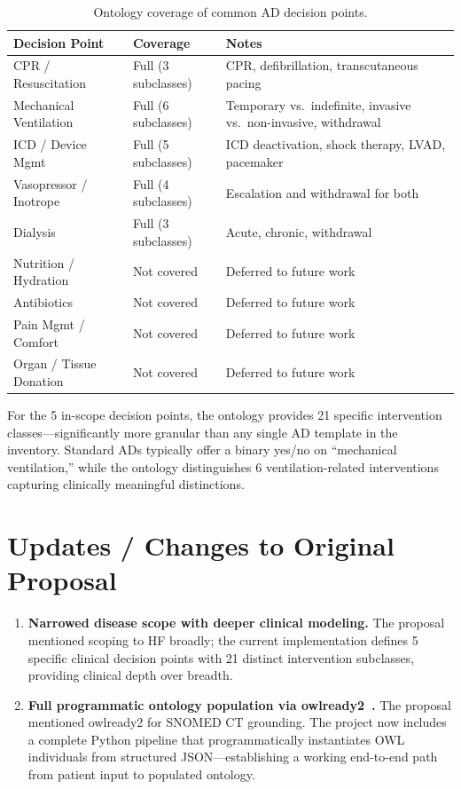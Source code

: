\documentclass[11pt]{article}
\begin{document}
\begin{table}[ht]
\centering
\caption{Ontology coverage of common AD decision points.}
\label{tab:coverage}
\small
\begin{tabular}{L{3.5cm} L{3cm} L{7cm}}
\toprule
\textbf{Decision Point} & \textbf{Coverage} & \textbf{Notes} \\
\midrule
CPR / Resuscitation & Full (3 subclasses) & CPR, defibrillation, transcutaneous pacing \\
Mechanical Ventilation & Full (6 subclasses) & Temporary vs.\ indefinite, invasive vs.\ non-invasive, withdrawal \\
ICD / Device Mgmt & Full (5 subclasses) & ICD deactivation, shock therapy, LVAD, pacemaker \\
Vasopressor / Inotrope & Full (4 subclasses) & Escalation and withdrawal for both \\
Dialysis & Full (3 subclasses) & Acute, chronic, withdrawal \\
\midrule
Nutrition / Hydration & Not covered & Deferred to future work \\
Antibiotics & Not covered & Deferred to future work \\
Pain Mgmt / Comfort & Not covered & Deferred to future work \\
Organ / Tissue Donation & Not covered & Deferred to future work \\
\bottomrule
\end{tabular}
\end{table}

For the 5 in-scope decision points, the ontology provides 21 specific intervention classes---significantly more granular than any single AD template in the inventory. Standard ADs typically offer a binary yes/no on ``mechanical ventilation,'' while the ontology distinguishes 6 ventilation-related interventions capturing clinically meaningful distinctions.

\section{Updates / Changes to Original Proposal}

\begin{enumerate}
    \item \textbf{Narrowed disease scope with deeper clinical modeling.} The proposal mentioned scoping to HF broadly; the current implementation defines 5 specific clinical decision points with 21 distinct intervention subclasses, providing clinical depth over breadth.

    \item \textbf{Full programmatic ontology population via owlready2~\cite{owlready2}.} The proposal mentioned owlready2 for SNOMED CT grounding. The project now includes a complete Python pipeline that programmatically instantiates OWL individuals from structured JSON---establishing a working end-to-end path from patient input to populated ontology.
\end{enumerate}
\end{document}
